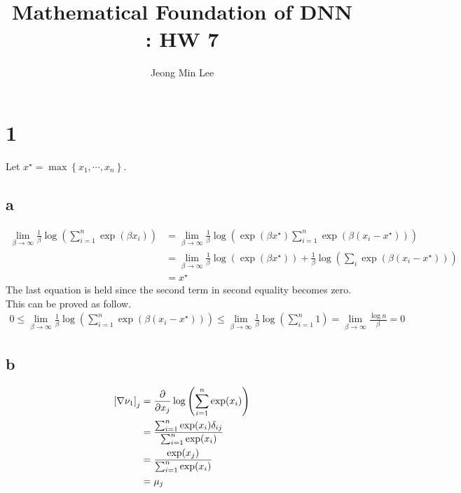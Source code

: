 \documentclass[10pt]{article}
\title{\textbf{Mathematical Foundation of DNN : HW 7}}
\author{Jeong Min Lee}
\begin{document}
\maketitle

\section*{1}
Let $x^\star = \max\left\{x_1, \cdots, x_n\right\}$.
\subsection*{a}
\begin{align*}
    \lim_{\beta \rightarrow \infty} \frac{1}{\beta}\log\left(\sum_{i=1}^n \exp(\beta x_i)\right) &= \lim_{\beta \rightarrow \infty} \frac{1}{\beta}\log \left( \exp(\beta x^\star)\sum_{i=1}^n \exp(\beta(x_i-x^\star))\right) \\
    &= \lim_{\beta \rightarrow \infty} \frac{1}{\beta} \log(\exp{(\beta x^\star)}) + \frac{1}{\beta} \log\left(\sum_i \exp(\beta(x_i - x^\star))\right) \\ &= x^\star
\end{align*}
The last equation is held since the second term in second equality becomes zero. This can be proved as follow.
\begin{align*}
    0 \le \lim_{\beta \rightarrow \infty} \frac{1}{\beta}\log\left(\sum_{i=1}^n \exp\left(\beta(x_i - x^\star)\right)\right) \le \lim_{\beta \rightarrow \infty} \frac{1}{\beta}\log\left(\sum_{i=1}^n 1\right) = \lim_{\beta \rightarrow \infty} \frac{\log n}{\beta} = 0
\end{align*}

\subsection*{b}
\begin{align*}
    \left[\nabla \nu_1\right]_j &= {\partial \over \partial x_j} \log \left(\sum_{i=1}^n \exp(x_i) \right)\\
    &= \frac{\sum_{i=1}^n \exp(x_i)\delta_{ij}}{\sum_{i=1}^n \exp(x_i)} \\
    &= \frac{\exp(x_j)}{\sum_{i=1}^n \exp(x_i)} \\ &= \mu_j
\end{align*}
\end{document}
